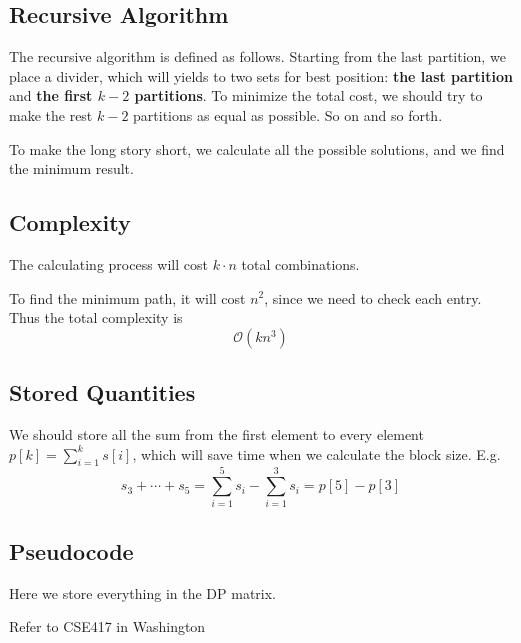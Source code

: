 \documentclass{article}
\begin{document}
\subsection{Recursive Algorithm}
The recursive algorithm is defined as follows. Starting from the last partition, we place a divider, which will yields to two sets for best position: \textbf{the last partition} and \textbf{the first $k-2$ partitions}. To minimize the total cost, we should try to make the rest $k-2$ partitions as equal as possible. So on and so forth. 

To make the long story short, we calculate all the possible solutions, and we find the minimum result.

\subsection{Complexity}
The calculating process will cost $k\cdot n$ total combinations. 

To find the minimum path, it will cost $n^2$, since we need to check each entry. Thus the total complexity is 
\[
	\mathcal{O}(kn^3)
\]

\subsection{Stored Quantities}
We should store all the sum from the first element to every element $p[k] = \sum_{i=1}^k s[i]$, which will save time when we calculate the block size. E.g. 
\begin{equation*}
s_3+ \cdots + s_5= \sum_{i=1}^5 s_i- \sum_{i=1}^3 s_i = p[5] - p[3]
\end{equation*}

\subsection{Pseudocode}
Here we store everything in the DP matrix.
\begin{algorithm}
\caption{Refer to CSE417 in Washington}
\end{algorithm}
\end{document}
